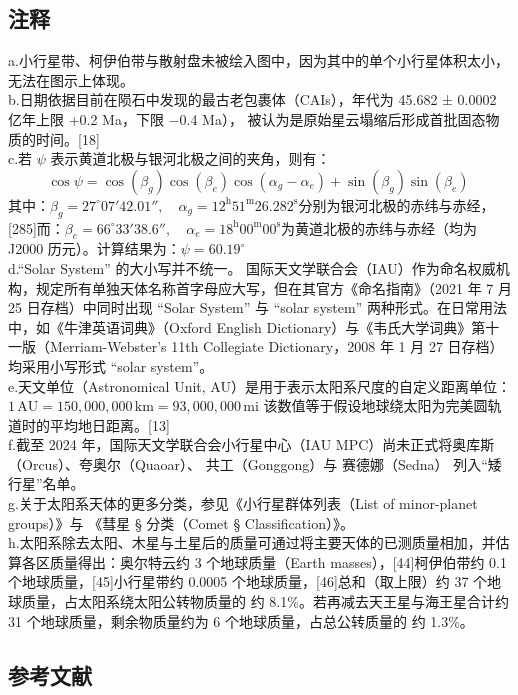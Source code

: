 \subsection{注释}
a.小行星带、柯伊伯带与散射盘未被绘入图中，因为其中的单个小行星体积太小，无法在图示上体现。\\ 
b.日期依据目前在陨石中发现的最古老包裹体（CAIs），年代为 45.682 ± 0.0002 亿年上限 +0.2 Ma，下限 −0.4 Ma）， 被认为是原始星云塌缩后形成首批固态物质的时间。[18] \\
c.若 $\psi$ 表示黄道北极与银河北极之间的夹角，则有：
\[
\cos \psi = \cos(\beta_g)\cos(\beta_e)\cos(\alpha_g - \alpha_e) + \sin(\beta_g)\sin(\beta_e)~
\]
其中：\(\beta_g = 27^{\circ}07'42.01'', \quad \alpha_g = 12^{\mathrm{h}}51^{\mathrm{m}}26.282^{\mathrm{s}}\)分别为银河北极的赤纬与赤经，[285]而：\(\beta_e = 66^{\circ}33'38.6'', \quad \alpha_e = 18^{\mathrm{h}}00^{\mathrm{m}}00^{\mathrm{s}}\)为黄道北极的赤纬与赤经（均为 J2000 历元）。计算结果为：\(\psi = 60.19^{\circ}\)\\
d.“Solar System” 的大小写并不统一。  国际天文学联合会（IAU）作为命名权威机构，规定所有单独天体名称首字母应大写，但在其官方《命名指南》（2021 年 7 月 25 日存档）中同时出现 “Solar System” 与 “solar system” 两种形式。在日常用法中，如《牛津英语词典》（Oxford English Dictionary）与《韦氏大学词典》第十一版（Merriam-Webster’s 11th Collegiate Dictionary，2008 年 1 月 27 日存档）均采用小写形式 “solar system”。\\ 
e.天文单位（Astronomical Unit, AU）是用于表示太阳系尺度的自定义距离单位：  
$1\,\mathrm{AU} = 150,000,000\,\mathrm{km} = 93,000,000\,\mathrm{mi}$
该数值等于假设地球绕太阳为完美圆轨道时的平均地日距离。[13]\\ 
f.截至 2024 年，国际天文学联合会小行星中心（IAU MPC）尚未正式将奥库斯（Orcus）、夸奥尔（Quaoar）、 共工（Gonggong）与 赛德娜（Sedna） 列入“矮行星”名单。\\  
g.关于太阳系天体的更多分类，参见《小行星群体列表（List of minor-planet groups）》与 《彗星 § 分类（Comet § Classification）》。\\  
h.太阳系除去太阳、木星与土星后的质量可通过将主要天体的已测质量相加，并估算各区质量得出：奥尔特云约 3 个地球质量（Earth masses），[44]柯伊伯带约 0.1 个地球质量，[45]小行星带约 0.0005 个地球质量，[46]总和（取上限）约 37 个地球质量，占太阳系绕太阳公转物质量的 约 8.1\%。若再减去天王星与海王星合计约 31 个地球质量，剩余物质量约为 6 个地球质量，占总公转质量的 约 1.3\%。  
\subsection{参考文献}
